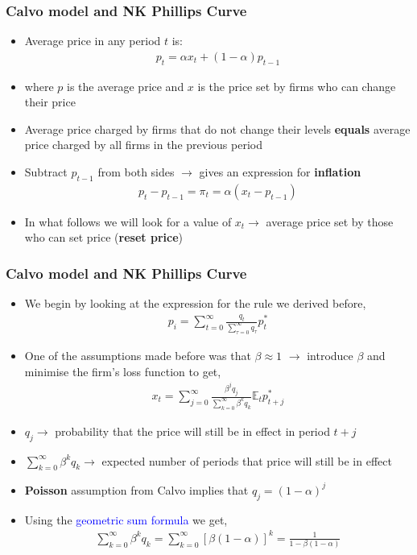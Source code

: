 \documentclass[10pt, xcolor=x11names, table]{beamer}
\begin{document}
\begin{frame}
\frametitle{Calvo model and NK Phillips Curve}
\begin{itemize}
\item Average price in any period $t$ is:
\begin{align*}
p_{t} = \alpha{x_{t}} + (1-\alpha)p_{t-1}
\end{align*}
\item where $p$ is the average price and $x$ is the price set by firms who can change their price
\item Average price charged by firms that do not change their levels \textbf{equals} average price charged by all firms in the previous period
\item Subtract $p_{t-1}$ from both sides $\rightarrow$ gives an expression for \textbf{inflation}
\begin{align*}
  p_{t} - p_{t-1} = \pi_{t} = \alpha(x_{t} - p_{t-1})
\end{align*}
\item In what follows we will look for a value of $x_{t} \rightarrow$ average price set by those who can set price (\textbf{reset price})
\end{itemize}
\end{frame}

\begin{frame}
\frametitle{Calvo model and NK Phillips Curve}
\begin{itemize}
\item We begin by looking at the expression for the rule we derived before,
\begin{align*}
p_{i} = \sum_{t=0}^{\infty}\frac{q_{t}}{\textstyle \sum_{\tau =0}^{\infty}q_{\tau}}p^{*}_{t}
\end{align*}
\item One of the assumptions made before was that $\beta \approx 1$ $\rightarrow$ introduce $\beta$ and minimise the firm's loss function to get,
\begin{align*}
  x_{t} = \sum_{j=0}^{\infty}\frac{\beta^{j}q_{j}}{\textstyle \sum_{k=0}^{\infty}\beta^{k}q_{k}}\mathbb{E}_{t}p^{*}_{t+j}
\end{align*}
\item $q_{j} \rightarrow$ probability that the price will still be in effect in period $t+j$
\item ${\textstyle \sum_{k=0}^{\infty}\beta^{k}q_{k}} \rightarrow$ expected number of periods that price will still be in effect
\item \textbf{Poisson} assumption from Calvo implies that $q_{j} = (1-\alpha)^{j}$
\item Using the \textcolor{blue}{geometric sum formula} we get,
\begin{align*}
\sum_{k=0}^{\infty}\beta^{k}q_{k} =  \sum_{k=0}^{\infty}\left[\beta(1-\alpha)\right]^{k} = \frac{1}{1-\beta(1-\alpha)}
\end{align*}
\end{itemize}
\end{frame}
\end{document}
